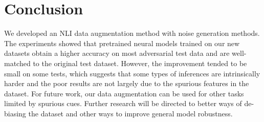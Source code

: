\section{Conclusion}
\label{sec:conclusion}
We developed an NLI data augmentation method with noise generation methods.
The experiments showed
that pretrained neural models trained on our new datasets 
obtain a higher accuracy on most adversarial test data 
and are well-matched to the original test dataset. 
However, the improvement tended to be small on some tests,
which suggests that some types of inferences are intrinsically harder 
and the poor results are not largely due to the spurious features in the dataset.
For future work, our data augmentation can be
used for other tasks limited by spurious cues. 
Further research will be directed to better
ways of de-biasing the dataset and other ways to improve general model robustness.

